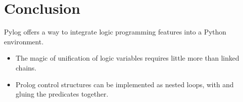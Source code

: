 \section{Conclusion}
  Pylog offers a way to integrate logic programming features into a Python environment.
  
  \begin{itemize}[label=$\bullet$]
  \item The magic of unification of logic variables requires little more than linked chains.
  \item Prolog control structures can be implemented as nested  loops, with  and   gluing the predicates together.
\end{itemize}
